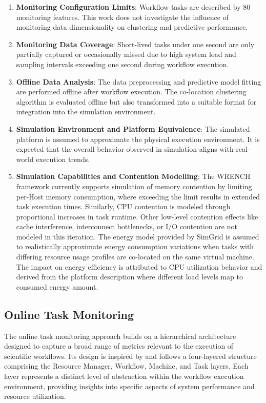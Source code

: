 \begin{enumerate}
    \item \textbf{Monitoring Configuration Limits}: Workflow tasks are described by 80 monitoring features. This work does not investigate the influence of monitoring data dimensionality on clustering and predictive performance.
    \item \textbf{Monitoring Data Coverage}: Short-lived tasks under one second are only partially captured or occasionally missed due to high system load and sampling intervals exceeding one second during workflow execution.
    \item \textbf{Offline Data Analysis}: The data preprocessing and predictive model fitting are performed offline after workflow execution. The co-location clustering algorithm is evaluated offline but also transformed into a suitable format for integration into the simulation environment.
    \item \textbf{Simulation Environment and Platform Equivalence}: The simulated platform is assumed to approximate the physical execution environment. It is expected that the overall behavior observed in simulation aligns with real-world execution trends.
    \item \textbf{Simulation Capabilities and Contention Modelling}: The WRENCH framework currently supports simulation of memory contention by limiting per-Host memory consumption, where exceeding the limit results in extended task execution times. Similarly, CPU contention is modeled through proportional increases in task runtime. Other low-level contention effects like cache interference, interconnect bottlenecks, or I/O contention are not modeled in this iteration. The energy model provided by SimGrid is assumed to realistically approximate energy consumption variations when tasks with differing resource usage profiles are co-located on the same virtual machine. The impact on energy efficiency is attributed to CPU utilization behavior and derived from the platform description where different load levels map to consumed energy amount.
\end{enumerate}

\subsection{Online Task Monitoring}
\label{sec:online_task_monitoring}

The online task monitoring approach builds on a hierarchical architecture designed to capture a broad range of metrics relevant to the execution of scientific workflows. Its design is inspired by \cite{Bader_2022} and follows a four-layered structure comprising the Resource Manager, Workflow, Machine, and Task layers. Each layer represents a distinct level of abstraction within the workflow execution environment, providing insights into specific aspects of system performance and resource utilization.

